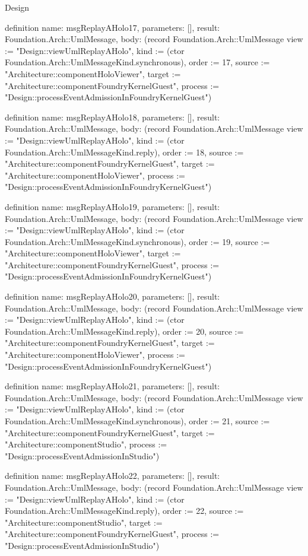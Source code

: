 \begin{lexlean}{Design}
\begin{semanticmodule}
definition{
  name: msgReplayAHolo17,
  parameters: [],
  result: Foundation.Arch::UmlMessage,
  body: (record Foundation.Arch::UmlMessage {view := "Design::viewUmlReplayAHolo", kind := (ctor Foundation.Arch::UmlMessageKind.synchronous), order := 17, source := "Architecture::componentHoloViewer", target := "Architecture::componentFoundryKernelGuest", process := "Design::processEventAdmissionInFoundryKernelGuest"})
}

definition{
  name: msgReplayAHolo18,
  parameters: [],
  result: Foundation.Arch::UmlMessage,
  body: (record Foundation.Arch::UmlMessage {view := "Design::viewUmlReplayAHolo", kind := (ctor Foundation.Arch::UmlMessageKind.reply), order := 18, source := "Architecture::componentFoundryKernelGuest", target := "Architecture::componentHoloViewer", process := "Design::processEventAdmissionInFoundryKernelGuest"})
}

definition{
  name: msgReplayAHolo19,
  parameters: [],
  result: Foundation.Arch::UmlMessage,
  body: (record Foundation.Arch::UmlMessage {view := "Design::viewUmlReplayAHolo", kind := (ctor Foundation.Arch::UmlMessageKind.synchronous), order := 19, source := "Architecture::componentHoloViewer", target := "Architecture::componentFoundryKernelGuest", process := "Design::processEventAdmissionInFoundryKernelGuest"})
}

definition{
  name: msgReplayAHolo20,
  parameters: [],
  result: Foundation.Arch::UmlMessage,
  body: (record Foundation.Arch::UmlMessage {view := "Design::viewUmlReplayAHolo", kind := (ctor Foundation.Arch::UmlMessageKind.reply), order := 20, source := "Architecture::componentFoundryKernelGuest", target := "Architecture::componentHoloViewer", process := "Design::processEventAdmissionInFoundryKernelGuest"})
}

definition{
  name: msgReplayAHolo21,
  parameters: [],
  result: Foundation.Arch::UmlMessage,
  body: (record Foundation.Arch::UmlMessage {view := "Design::viewUmlReplayAHolo", kind := (ctor Foundation.Arch::UmlMessageKind.synchronous), order := 21, source := "Architecture::componentFoundryKernelGuest", target := "Architecture::componentStudio", process := "Design::processEventAdmissionInStudio"})
}

definition{
  name: msgReplayAHolo22,
  parameters: [],
  result: Foundation.Arch::UmlMessage,
  body: (record Foundation.Arch::UmlMessage {view := "Design::viewUmlReplayAHolo", kind := (ctor Foundation.Arch::UmlMessageKind.reply), order := 22, source := "Architecture::componentStudio", target := "Architecture::componentFoundryKernelGuest", process := "Design::processEventAdmissionInStudio"})
}


\end{semanticmodule}
\end{lexlean}
